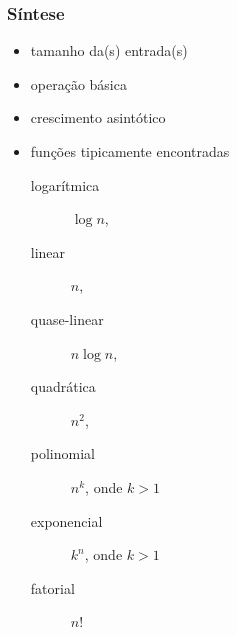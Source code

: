 \documentclass{beamer}
\begin{document}
\begin{frame}

\frametitle{Síntese}

\begin{itemize}

\item tamanho da(s) entrada(s)

\item operação básica

\item crescimento asintótico

\item funções tipicamente encontradas

\begin{description}
\item[logarítmica] $\log n$, 
\item[linear] $n$, 
\item[quase-linear] $n \log n$, 
\item[quadrática] $n^2$, 
\item[polinomial] $n^k$, onde $k > 1$
\item[exponencial] $k^n$, onde $k > 1$
\item[fatorial] $n!$
\end{description}
\end{itemize}

\end{frame}
\end{document}
